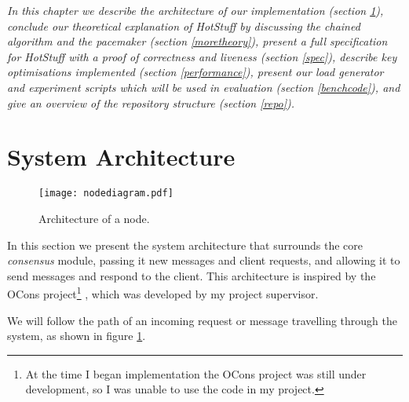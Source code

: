\textit{In this chapter we describe the architecture of our implementation (section \ref{architecture}), conclude our theoretical explanation of HotStuff by discussing the chained algorithm and the pacemaker (section \ref{moretheory}), present a full specification for HotStuff with a proof of correctness and liveness (section \ref{spec}), describe key optimisations implemented (section \ref{performance}), present our load generator and experiment scripts which will be used in evaluation (section \ref{benchcode}), and give an overview of the repository structure (section \ref{repo}).}

\section{System Architecture} \label{architecture}

\begin{figure}[h!]
\centering
\texttt{[image: nodediagram.pdf]}
\caption{Architecture of a node.}
\label{nodediagram}
\end{figure}

In this section we present the system architecture that surrounds the core \textit{consensus} module, passing it new messages and client requests, and allowing it to send messages and respond to the client. This architecture is inspired by the OCons project\footnote{At the time I began implementation the OCons project was still under development, so I was unable to use the code in my project.} \cite{ocons}, which was developed by my project supervisor.

We will follow the path of an incoming request or message travelling through the system, as shown in figure \ref{nodediagram}.

